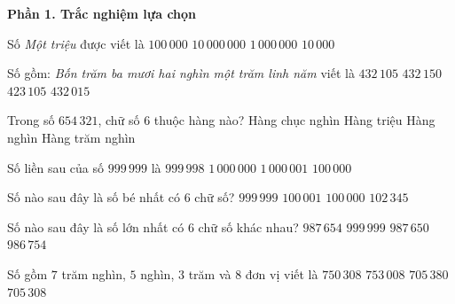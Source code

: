 \textbf{Phần 1. Trắc nghiệm lựa chọn}

\begin{ex} %
Số \textit{Một triệu} được viết là
\choice
{$100\,000$}
{$10\,000\,000$}
{\True $1\,000\,000$}
{$10\,000$}
\end{ex}

\begin{ex} %
Số gồm: \textit{Bốn trăm ba mươi hai nghìn một trăm linh năm} viết là
\choice
{\True $432\,105$}
{$432\,150$}
{$423\,105$}
{$432\,015$}
\end{ex}

\begin{ex} %
Trong số $654\,321$, chữ số $6$ thuộc hàng nào?
\choice
{Hàng chục nghìn}
{Hàng triệu}
{Hàng nghìn}
{\True Hàng trăm nghìn}
\end{ex}

\begin{ex} %
Số liền sau của số $999\,999$ là
\choice
{$999\,998$}
{\True $1\,000\,000$}
{$1\,000\,001$}
{$100\,000$}
\end{ex}

\begin{ex} %
Số nào sau đây là số bé nhất có 6 chữ số?
\choice
{$999\,999$}
{$100\,001$}
{\True $100\,000$}
{$102\,345$}
\end{ex}

\begin{ex} %
Số nào sau đây là số lớn nhất có 6 chữ số khác nhau?
\choice
{\True $987\,654$}
{$999\,999$}
{$987\,650$}
{$986\,754$}
\end{ex}

\begin{ex} %
Số gồm $7$ trăm nghìn, $5$ nghìn, $3$ trăm và $8$ đơn vị viết là
\choice
{$750\,308$}
{$753\,008$}
{$705\,380$}
{\True $705\,308$}
\end{ex}

